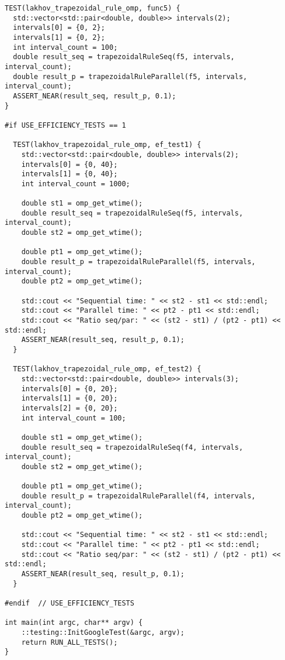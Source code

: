 \documentclass{report}
\begin{document}
\begin{lstlisting}
TEST(lakhov_trapezoidal_rule_omp, func5) {
  std::vector<std::pair<double, double>> intervals(2);
  intervals[0] = {0, 2};
  intervals[1] = {0, 2};
  int interval_count = 100;
  double result_seq = trapezoidalRuleSeq(f5, intervals, interval_count);
  double result_p = trapezoidalRuleParallel(f5, intervals, interval_count);
  ASSERT_NEAR(result_seq, result_p, 0.1);
}

#if USE_EFFICIENCY_TESTS == 1

  TEST(lakhov_trapezoidal_rule_omp, ef_test1) {
    std::vector<std::pair<double, double>> intervals(2);
    intervals[0] = {0, 40};
    intervals[1] = {0, 40};
    int interval_count = 1000;

    double st1 = omp_get_wtime();
    double result_seq = trapezoidalRuleSeq(f5, intervals, interval_count);
    double st2 = omp_get_wtime();

    double pt1 = omp_get_wtime();
    double result_p = trapezoidalRuleParallel(f5, intervals, interval_count);
    double pt2 = omp_get_wtime();

    std::cout << "Sequential time: " << st2 - st1 << std::endl;
    std::cout << "Parallel time: " << pt2 - pt1 << std::endl;
    std::cout << "Ratio seq/par: " << (st2 - st1) / (pt2 - pt1) << std::endl;
    ASSERT_NEAR(result_seq, result_p, 0.1);
  }

  TEST(lakhov_trapezoidal_rule_omp, ef_test2) {
    std::vector<std::pair<double, double>> intervals(3);
    intervals[0] = {0, 20};
    intervals[1] = {0, 20};
    intervals[2] = {0, 20};
    int interval_count = 100;

    double st1 = omp_get_wtime();
    double result_seq = trapezoidalRuleSeq(f4, intervals, interval_count);
    double st2 = omp_get_wtime();

    double pt1 = omp_get_wtime();
    double result_p = trapezoidalRuleParallel(f4, intervals, interval_count);
    double pt2 = omp_get_wtime();

    std::cout << "Sequential time: " << st2 - st1 << std::endl;
    std::cout << "Parallel time: " << pt2 - pt1 << std::endl;
    std::cout << "Ratio seq/par: " << (st2 - st1) / (pt2 - pt1) << std::endl;
    ASSERT_NEAR(result_seq, result_p, 0.1);
  }

#endif  // USE_EFFICIENCY_TESTS

int main(int argc, char** argv) {
    ::testing::InitGoogleTest(&argc, argv);
    return RUN_ALL_TESTS();
}
\end{lstlisting}
\end{document}
